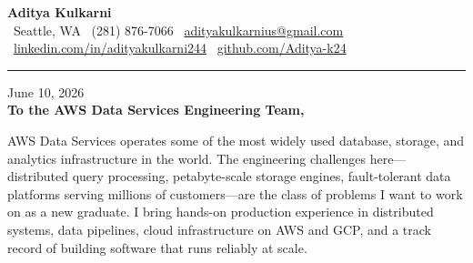 \documentclass[11pt,letterpaper]{article}
\begin{document}
\begin{center}
    {\Huge \textbf{\color{AmazonOrange} Aditya Kulkarni}}\\[8pt]
    {\color{DarkGrey} \small
    \faMapMarker* \ Seattle, WA \quad \textbar \quad
    \faPhone \ (281) 876-7066 \quad \textbar \quad
    \faEnvelope \ \href{mailto:adityakulkarnius@gmail.com}{adityakulkarnius@gmail.com} \\[4pt]
    \faLinkedin \ \href{https://linkedin.com/in/adityakulkarni244}{linkedin.com/in/adityakulkarni244} \quad \textbar \quad
    \faGithub \ \href{https://github.com/Aditya-k24}{github.com/Aditya-k24}
    }
\end{center}

\vspace{-4pt}
{\color{AmazonOrange}\rule{\linewidth}{1.5pt}}
\vspace{10pt}

June 10, 2026\\[10pt]
\textbf{To the AWS Data Services Engineering Team,}

\vspace{6pt}

AWS Data Services operates some of the most widely used database, storage, and analytics infrastructure in the world. The engineering challenges here---distributed query processing, petabyte-scale storage engines, fault-tolerant data platforms serving millions of customers---are the class of problems I want to work on as a new graduate. I bring hands-on production experience in distributed systems, data pipelines, cloud infrastructure on AWS and GCP, and a track record of building software that runs reliably at scale.

\vspace{4pt}
\end{document}
